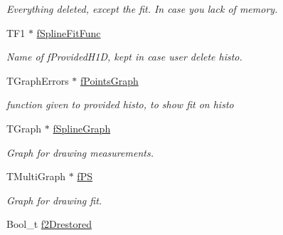 \begin{DoxyCompactItemize}
\begin{DoxyCompactList}\small\item\em Everything deleted, except the fit. In case you lack of memory. \end{DoxyCompactList}\item 
\hypertarget{classTSplineFit_ae7551c885341a259af6fe41f8954a34e}{T\-F1 $\ast$ \hyperlink{classTSplineFit_ae7551c885341a259af6fe41f8954a34e}{f\-Spline\-Fit\-Func}}\label{classTSplineFit_ae7551c885341a259af6fe41f8954a34e}

\begin{DoxyCompactList}\small\item\em Name of f\-Provided\-H1\-D, kept in case user delete histo. \end{DoxyCompactList}\item 
\hypertarget{classTSplineFit_af15345f344209bd84c44df45229760d8}{T\-Graph\-Errors $\ast$ \hyperlink{classTSplineFit_af15345f344209bd84c44df45229760d8}{f\-Points\-Graph}}\label{classTSplineFit_af15345f344209bd84c44df45229760d8}

\begin{DoxyCompactList}\small\item\em function given to provided histo, to show fit on histo \end{DoxyCompactList}\item 
\hypertarget{classTSplineFit_acf2a5ff32b79972d4f889720a97ee664}{T\-Graph $\ast$ \hyperlink{classTSplineFit_acf2a5ff32b79972d4f889720a97ee664}{f\-Spline\-Graph}}\label{classTSplineFit_acf2a5ff32b79972d4f889720a97ee664}

\begin{DoxyCompactList}\small\item\em Graph for drawing measurements. \end{DoxyCompactList}\item 
\hypertarget{classTSplineFit_a3d189c234f8474cb2afc90dc1ad6e04f}{T\-Multi\-Graph $\ast$ \hyperlink{classTSplineFit_a3d189c234f8474cb2afc90dc1ad6e04f}{f\-P\-S}}\label{classTSplineFit_a3d189c234f8474cb2afc90dc1ad6e04f}

\begin{DoxyCompactList}\small\item\em Graph for drawing fit. \end{DoxyCompactList}\item 
\hypertarget{classTSplineFit_a741d45f1c508943fd905aa8ff4c98c35}{Bool\-\_\-t \hyperlink{classTSplineFit_a741d45f1c508943fd905aa8ff4c98c35}{f2\-Drestored}}\label{classTSplineFit_a741d45f1c508943fd905aa8ff4c98c35}


\end{DoxyCompactItemize}
